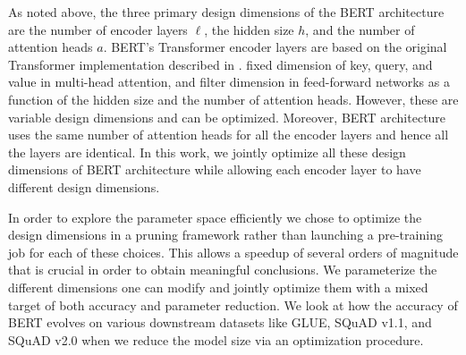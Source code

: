 \documentclass[11pt,a4paper]{article}
\begin{document}
As noted above, the three primary design dimensions of the BERT architecture are the number of encoder layers $\ell$, the hidden size $h$, and the number of attention heads $a$. BERT's Transformer encoder layers are based on the original Transformer implementation described in \citet{vaswani2017attention}. \citet{vaswani2017attention} fixed dimension of key, query, and value in multi-head attention, and filter dimension in feed-forward networks as a function of the hidden size and the number of attention heads. However, these are variable design dimensions and can be optimized. Moreover, BERT architecture uses the same number of attention heads for all the encoder layers and hence all the layers are identical. In this work, we jointly optimize all these design dimensions of BERT architecture while allowing each encoder layer to have different design dimensions. 

In order to explore the parameter space efficiently we chose to optimize the design dimensions in a pruning framework rather than launching a pre-training job for each of these choices. This allows a speedup of several orders of magnitude that is crucial in order to obtain meaningful conclusions. 
We parameterize the different dimensions one can modify and jointly optimize them with a mixed target of both accuracy and parameter reduction. We look at how the accuracy of BERT evolves on various downstream datasets like GLUE, SQuAD v1.1, and SQuAD v2.0 when we reduce the model size
via an optimization procedure.

\end{document}
